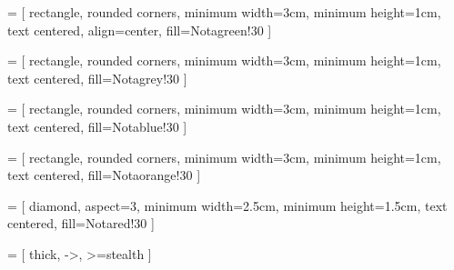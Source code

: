 \usepackage{tikz}
\usetikzlibrary{shapes.geometric, arrows}

 = [
    rectangle, rounded corners, 
    minimum width=3cm, 
    minimum height=1cm,
    text centered,  
    align=center,
    fill=Notagreen!30
]

 = [
    rectangle, rounded corners, 
    minimum width=3cm, 
    minimum height=1cm,
    text centered,  
    fill=Notagrey!30
]

 = [
    rectangle, rounded corners, 
    minimum width=3cm, 
    minimum height=1cm, 
    text centered, 
    fill=Notablue!30
]

 = [
    rectangle, rounded corners, 
    minimum width=3cm, 
    minimum height=1cm, 
    text centered, 
    fill=Notaorange!30
]

 = [
    diamond,
    aspect=3,
    minimum width=2.5cm, 
    minimum height=1.5cm, 
    text centered, 
    fill=Notared!30
]

 = [
    thick,
    ->,
    >=stealth
]